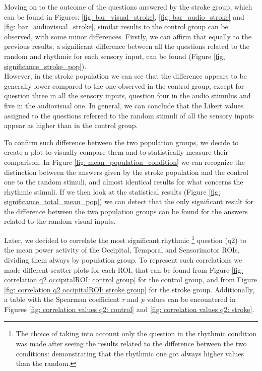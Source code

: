 Moving on to the outcome of the questions answered by the stroke group, which can be found in Figures: \ref{fig: bar_visual_stroke}, \ref{fig: bar_audio_stroke} and \ref{fig: bar_audiovisual_stroke}, similar results to the control group can be observed, with some minor differences. Firstly, we can affirm that equally to the previous results, a significant difference between all the questions related to the random and rhythmic for each sensory input, can be found (Figure \ref{fig: significance_stroke_pop}). \\ However, in the stroke population we can see that the difference appears to be generally lower compared to the one observed in the control group, except for question three in all the sensory inputs, question four in the audio stimulus and five in the audiovisual one. In general, we can conclude that the Likert values assigned to the questions referred to the random stimuli of all the sensory inputs appear as higher than in the control group.

To confirm such difference between the two population groups, we decide to create a plot to visually compare them and to statistically measure their comparison. In Figure \ref{fig: mean_population_condition} we can recognize the distinction between the answers given by the stroke population and the control one to the random stimuli, and almost identical results for what concerns the rhythmic stimuli. If we then look at the statistical results (Figure \ref{fig: significance_total_mean_pop}) we can detect that the only significant result for the difference between the two population groups can be found for the answers related to the random visual inputs. 

Later, we decided to correlate the most significant rhythmic \footnote{The choice of taking into account only the question in the rhythmic condition was made after seeing the results related to the difference between the two conditions: demonstrating that the rhythmic one got always higher values than the random.} question (q2) to the mean power activity of the Occipital, Temporal and Sensorimotor ROIs, dividing them always by population group. To represent such correlations we made different scatter plots for each ROI, that can be found from Figure \ref{fig: correlation q2 occipitalROI: control group} for the control group, and from Figure \ref{fig: correlation q2 occipitalROI: stroke group} for the stroke group. Additionally, a table with the Spearman coefficient \textit{r} and \textit{p} values can be encountered in Figures \ref{fig: correlation values q2: control} and \ref{fig: correlation values q2: stroke}. 

